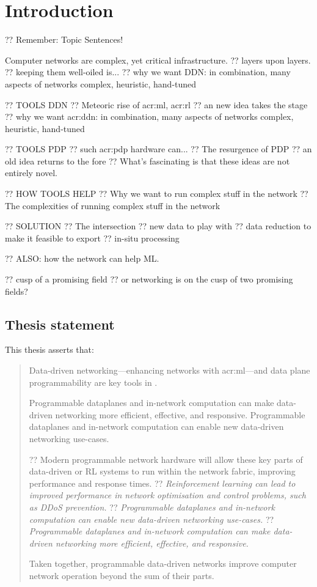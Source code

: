 \chapter{Introduction}\label{chap:intro}


?? Remember: Topic Sentences!

Computer networks are complex, yet critical infrastructure.
?? layers upon layers.
?? keeping them well-oiled is...
?? why we want DDN: in combination, many aspects of networks complex, heuristic, hand-tuned

?? TOOLS DDN
?? Meteoric rise of \gls{acr:ml}, \gls{acr:rl}
?? an new idea takes the stage
?? why we want \gls{acr:ddn}: in combination, many aspects of networks complex, heuristic, hand-tuned

?? TOOLS PDP
?? such \gls{acr:pdp} hardware can...
?? The resurgence of PDP
?? an old idea returns to the fore
?? What's fascinating is that these ideas are not entirely novel.

?? HOW TOOLS HELP
?? Why we want to run complex stuff in the network
?? The complexities of running complex stuff in the network

?? SOLUTION
?? The intersection
?? new data to play with
?? data reduction to make it feasible to export
?? in-situ processing

?? ALSO: how the network can help ML.

?? cusp of a promising field
?? or networking is on the cusp of two promising fields?

\section{Thesis statement}
This thesis asserts that:
\begin{quotation}
	\noindent
	Data-driven networking---enhancing networks with \gls{acr:ml}---and data plane programmability are key tools in .
	
	Programmable dataplanes and in-network computation can make data-driven networking more efficient, effective, and responsive.
	Programmable dataplanes and in-network computation can enable new data-driven networking use-cases.
	
	
	?? Modern programmable network hardware will allow these key parts of data-driven or RL systems to run within the network fabric, improving performance and response times.
	?? \emph{Reinforcement learning can lead to improved performance in network optimisation and control problems, such as DDoS prevention.}
	?? \emph{Programmable dataplanes and in-network computation can enable new data-driven networking use-cases.}
	?? \emph{Programmable dataplanes and in-network computation can make data-driven networking more efficient, effective, and responsive.}
	
	Taken together, programmable data-driven networks improve computer network operation beyond the sum of their parts.
\end{quotation}

